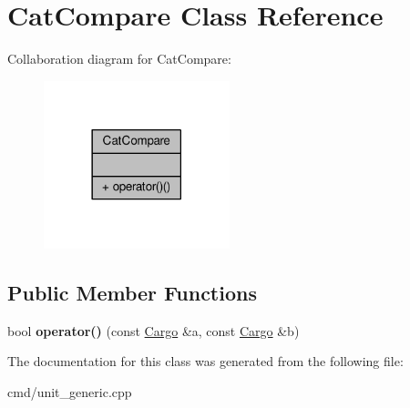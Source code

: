 \hypertarget{classCatCompare}{}\section{Cat\+Compare Class Reference}
\label{classCatCompare}


Collaboration diagram for Cat\+Compare\+:
\nopagebreak
\begin{figure}[H]
\begin{center}
\leavevmode
\includegraphics[width=153pt]{d2/d3b/classCatCompare__coll__graph}
\end{center}
\end{figure}
\subsection*{Public Member Functions}
\begin{DoxyCompactItemize}
\item 
bool {\bfseries operator()} (const \hyperlink{classCargo}{Cargo} \&a, const \hyperlink{classCargo}{Cargo} \&b)\hypertarget{classCatCompare_a1ac0e10c743d9c63dd004d45465aa729}{}\label{classCatCompare_a1ac0e10c743d9c63dd004d45465aa729}

\end{DoxyCompactItemize}


The documentation for this class was generated from the following file\+:\begin{DoxyCompactItemize}
\item 
cmd/unit\+\_\+generic.\+cpp\end{DoxyCompactItemize}
